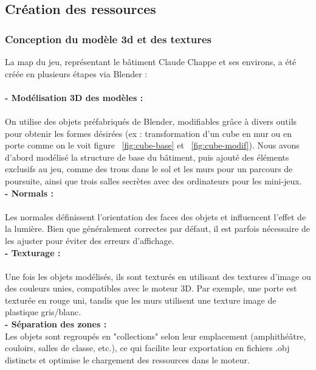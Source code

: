 \subsection{Création des ressources}
\subsubsection{Conception du modèle 3d et des textures}
La map du jeu, représentant le bâtiment Claude Chappe et ses
environs, a été créée en plusieurs étapes via Blender : \\ \\
\textbf{- Modélisation 3D des modèles :} \\
\\
On utilise des objets préfabriqués de Blender, modifiables
grâce à divers outils pour obtenir les formes désirées (ex :
transformation d'un cube en mur ou en porte comme on le voit
figure ~\ref{fig:cube-base} et ~\ref{fig:cube-modif}). Nous
avons d'abord modélisé la structure de base du bâtiment, puis
ajouté des éléments exclusifs au jeu, comme des trous dans le
sol et les murs pour un parcours de poursuite, ainsi que trois
salles secrètes avec des ordinateurs pour les mini-jeux.\\

\textbf{- Normals :} \\\\
Les normales définissent l'orientation des faces des objets et
influencent l'effet de la lumière. Bien que généralement correctes
par défaut, il est parfois nécessaire de les ajuster pour éviter
des erreurs d'affichage. \\

\textbf{- Texturage :} \\ \\
Une fois les objets modélisés, ils sont texturés en utilisant des
textures d’image ou des couleurs unies, compatibles avec le
moteur 3D. Par exemple, une porte est texturée en rouge uni,
tandis que les murs utilisent une texture image de plastique
gris/blanc.\\

\textbf{- Séparation des zones :} \\

Les objets sont regroupés en "collections" selon leur emplacement
(amphithéâtre, couloirs, salles de classe, etc.), ce qui facilite
leur exportation en fichiers .obj distincts et optimise le
chargement des ressources dans le moteur.\\

